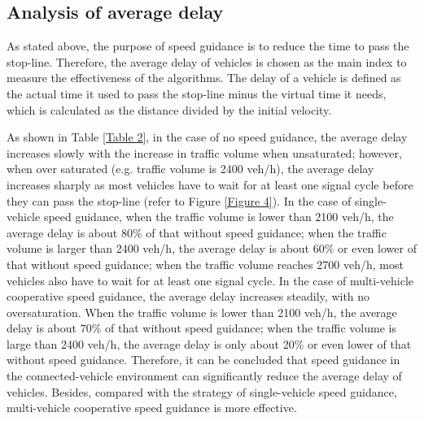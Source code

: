 \documentclass[10.5pt,compsoc]{TsT}
\theoremstyle{mystyle}
\begin{document}
{\subsection{Analysis of average delay}

As stated above, the purpose of speed guidance is to reduce the time to
pass the stop-line. Therefore, the average delay of vehicles is chosen
as the main index to measure the effectiveness of the algorithms. The
delay of a vehicle is defined as the actual time it used to pass the
stop-line minus the virtual time it needs, which is calculated as the
distance divided by the initial velocity.

As shown in Table \ref{Table 2}, in the case of no speed guidance, the average delay
increases slowly with the increase in traffic volume when unsaturated;
however, when over saturated (e.g. traffic volume is 2400 veh/h), the
average delay increases sharply as most vehicles have to wait for at
least one signal cycle before they can pass the stop-line (refer to
Figure \ref{Figure 4}). In the case of single-vehicle speed guidance, when the
traffic volume is lower than 2100 veh/h, the average delay is about 80\%
of that without speed guidance; when the traffic volume is larger than
2400 veh/h, the average delay is about 60\% or even lower of that
without speed guidance; when the traffic volume reaches 2700 veh/h, most
vehicles also have to wait for at least one signal cycle. In the case of
multi-vehicle cooperative speed guidance, the average delay increases
steadily, with no oversaturation. When the traffic volume is lower than
2100 veh/h, the average delay is about 70\% of that without speed
guidance; when the traffic volume is large than 2400 veh/h, the average
delay is only about 20\% or even lower of that without speed guidance.
Therefore, it can be concluded that speed guidance in the
connected-vehicle environment can significantly reduce the average delay
of vehicles. Besides, compared with the strategy of single-vehicle speed
guidance, multi-vehicle cooperative speed guidance is more effective.

}
\end{document}
